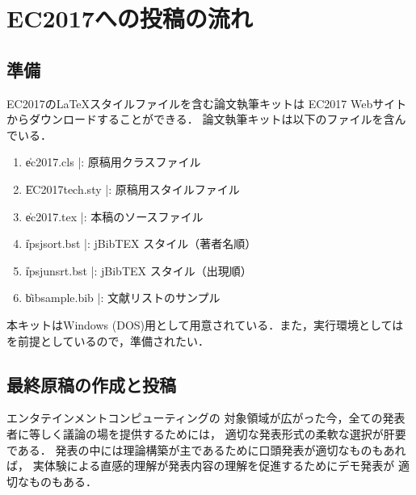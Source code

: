 
\section{EC2017への投稿の流れ}

\subsection{準備}
EC2017の\LaTeX スタイルファイルを含む論文執筆キットは
EC2017 Webサイトからダウンロードすることができる．
論文執筆キットは以下のファイルを含んでいる．
\begin{enumerate}
\item \|ec2017.cls     |: 原稿用クラスファイル
\item \|EC2017tech.sty |: 原稿用スタイルファイル
\item \|ec2017.tex     |: 本稿のソースファイル
\item \|ipsjsort.bst  |: jBibTEX スタイル（著者名順）
\item \|ipsjunsrt.bst |: jBibTEX スタイル（出現順）
\item \|bibsample.bib |: 文献リストのサンプル
\end{enumerate}
本キットはWindows (DOS)用として用意されている．また，実行環境としては
\LaTeXe を前提としているので，準備されたい．


\subsection{最終原稿の作成と投稿}

エンタテインメントコンピューティングの
対象領域が広がった今，全ての発表者に等しく議論の場を提供するためには，
適切な発表形式の柔軟な選択が肝要である．
発表の中には理論構築が主であるために口頭発表が適切なものもあれば，
実体験による直感的理解が発表内容の理解を促進するためにデモ発表が
適切なものもある．

